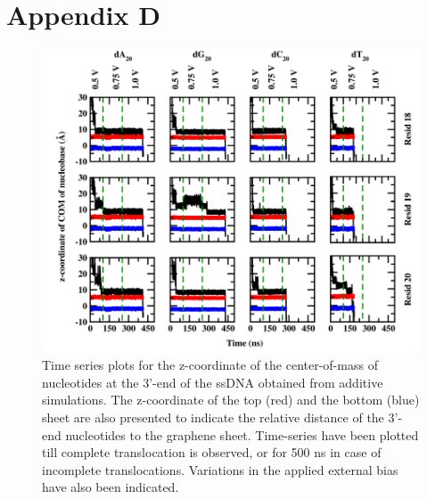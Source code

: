 \chapter{Appendix D}
\setcounter{figure}{0}
\renewcommand{\thefigure}{D.\arabic{figure}}
\renewcommand{\thesection}{D.\arabic{section}}

\begin{figure}
    \centering
    \includegraphics[width=\textwidth]{Appendix/Figures/D1_port.png}
    \caption[Time series plots for the z-coordinate of the center-of-mass of nucleotides at the 3’-end of the ssDNA obtained from additive simulations]{Time series plots for the z-coordinate of the center-of-mass of nucleotides at the 3’-end of the ssDNA obtained from additive simulations. The z-coordinate of the top (red) and the bottom (blue) sheet are also presented to indicate the relative distance of the 3’-end nucleotides to the graphene sheet. Time-series have been plotted till complete translocation is observed, or for 500 ns in case of incomplete translocations. Variations in the applied external bias have also been indicated.}
\end{figure}

